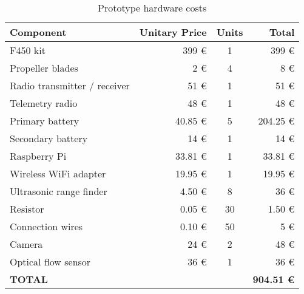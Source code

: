 \begin{table}
\centering
\begin{tabular}[htbp]{lrcr}
	\hline
	\bfseries Component	&	\bfseries Unitary Price	&	\bfseries Units	&	\bfseries Total	\\
	\hline
	F450 kit			&	399 \euro				&	1			&	399 \euro	\\
	Propeller blades	&	2 \euro					&	4			&	8 \euro		\\
	Radio transmitter / receiver	&	51 \euro	&	1			&	51 \euro	\\
	Telemetry radio		&	48 \euro				&	1			&	48 \euro	\\
	Primary battery		&	40.85 \euro				&	5			&	204.25 \euro\\
	Secondary battery	&	14 \euro				&	1			&	14 \euro	\\
	Raspberry Pi		&	33.81 \euro				&	1			&	33.81 \euro	\\
	Wireless WiFi adapter	&	19.95 \euro			&	1			&	19.95 \euro	\\
	Ultrasonic range finder	&	4.50 \euro			&	8			&	36 \euro	\\
	Resistor			&	0.05 \euro				&	30			&	1.50 \euro	\\
	Connection wires	&	0.10 \euro				&	50			&	5 \euro		\\
	Camera				&	24 \euro				&	2			&	48 \euro	\\
	Optical flow sensor	&	36 \euro				&	1			&	36 \euro	\\
	\hline
	\bfseries TOTAL		&	&	&	\bfseries 904.51 \euro\\
	\hline
\end{tabular}
\caption{Prototype hardware costs}
\label{tab:budget}
\end{table}

